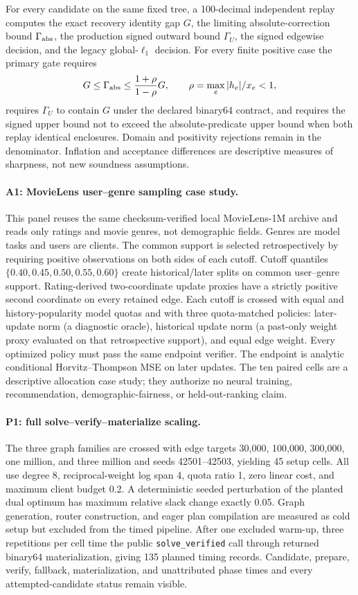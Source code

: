 For every candidate on the same fixed tree, a 100-decimal independent replay
computes the exact recovery identity gap $G$, the limiting
absolute-correction bound $\Gamma_{\rm abs}$, the production signed outward
bound $\Gamma_U$, the signed edgewise decision, and the legacy global-$\ell_1$
decision.  For every finite positive case the primary gate requires
\[
 G\leq\Gamma_{\rm abs}
 \leq\frac{1+\rho}{1-\rho}G,
 \qquad \rho=\max_e |h_e|/x_e<1,
\]
requires $\Gamma_U$ to contain $G$ under the declared binary64 contract, and
requires the signed upper bound not to exceed the absolute-predicate upper
bound when both replay identical enclosures.  Domain and positivity rejections remain in the
denominator.  Inflation and acceptance differences are descriptive measures of
sharpness, not new soundness assumptions.

\paragraph{A1: MovieLens user--genre sampling case study.}
This panel reuses the same checksum-verified local MovieLens-1M archive and reads
only ratings and movie genres, not demographic fields.  Genres are model tasks
and users are clients.  The common support is selected retrospectively by
requiring positive observations on both sides of each cutoff.  Cutoff quantiles
$\{0.40,0.45,0.50,0.55,0.60\}$ create historical/later splits on common
user--genre support.  Rating-derived two-coordinate update proxies have a
strictly positive second coordinate on every retained edge.  Each cutoff is
crossed with equal and history-popularity model quotas and with three
quota-matched policies: later-update norm (a diagnostic oracle), historical
update norm (a past-only weight proxy evaluated on that retrospective support),
and equal edge weight.  Every optimized
policy must pass the same endpoint verifier.  The endpoint is analytic
conditional Horvitz--Thompson MSE on later updates.  The ten paired cells are a
descriptive allocation case study; they authorize no neural training,
recommendation, demographic-fairness, or held-out-ranking claim.

\paragraph{P1: full solve--verify--materialize scaling.}
The three graph families are crossed with edge targets 30,000, 100,000,
300,000, one million, and three million and seeds 42501--42503, yielding 45
setup cells.  All use degree 8, reciprocal-weight log span 4, quota ratio 1,
zero linear cost, and maximum client budget 0.2.  A deterministic seeded
perturbation of the planted dual optimum has maximum relative slack change
exactly 0.05.  Graph generation, router construction, and eager plan
compilation are measured as cold setup but excluded from the timed pipeline.
After one excluded warm-up, three repetitions per cell time the public
\texttt{solve\_verified} call through returned binary64 materialization, giving
135 planned timing records.  Candidate, prepare, verify, fallback,
materialization, and unattributed phase times and every attempted-candidate
status remain visible.

